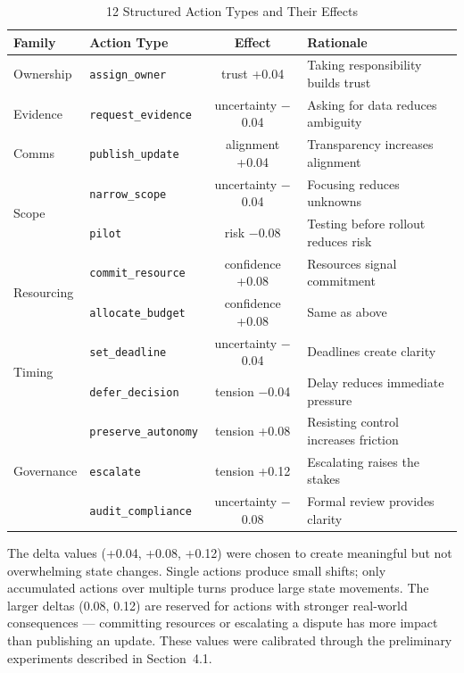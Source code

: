 \documentclass[12pt, a4paper]{report}
\begin{document}
\begin{table}[t]
\centering
\caption{12 Structured Action Types and Their Effects}
\label{tab:actions}
\scriptsize
\begin{tabular}{p{1.5cm}lcp{3.5cm}}
\toprule
Family & Action Type & Effect & Rationale \\
\midrule
Ownership   & \texttt{assign\_owner}      & trust +0.04 & Taking responsibility builds trust \\
Evidence    & \texttt{request\_evidence}   & uncertainty $-$0.04 & Asking for data reduces ambiguity \\
Comms       & \texttt{publish\_update}     & alignment +0.04 & Transparency increases alignment \\
\multirow{2}{*}{Scope}
            & \texttt{narrow\_scope}       & uncertainty $-$0.04 & Focusing reduces unknowns \\
            & \texttt{pilot}               & risk $-$0.08 & Testing before rollout reduces risk \\
\multirow{2}{*}{Resourcing}
            & \texttt{commit\_resource}    & confidence +0.08 & Resources signal commitment \\
            & \texttt{allocate\_budget}    & confidence +0.08 & Same as above \\
\multirow{2}{*}{Timing}
            & \texttt{set\_deadline}       & uncertainty $-$0.04 & Deadlines create clarity \\
            & \texttt{defer\_decision}     & tension $-$0.04 & Delay reduces immediate pressure \\
\multirow{3}{*}{Governance}
            & \texttt{preserve\_autonomy}  & tension +0.08 & Resisting control increases friction \\
            & \texttt{escalate}            & tension +0.12 & Escalating raises the stakes \\
            & \texttt{audit\_compliance}   & uncertainty $-$0.08 & Formal review provides clarity \\
\bottomrule
\end{tabular}
\end{table}

The delta values (+0.04, +0.08, +0.12) were chosen to create meaningful but not overwhelming state changes. Single actions produce small shifts; only accumulated actions over multiple turns produce large state movements. The larger deltas (0.08, 0.12) are reserved for actions with stronger real-world consequences --- committing resources or escalating a dispute has more impact than publishing an update. These values were calibrated through the preliminary experiments described in Section~4.1.
\end{document}
